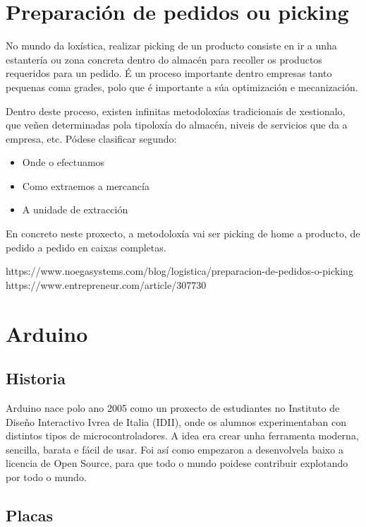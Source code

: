 \documentclass[11pt,twoside]{book}
\begin{document}
\chapter{Preparación de pedidos ou picking}

No mundo da loxística, realizar picking de un producto consiste en ir a unha estantería ou zona concreta dentro do almacén para recoller os productos requeridos para un pedido. É un proceso importante dentro empresas tanto pequenas coma grades, polo que é importante a súa optimización e mecanización.

Dentro deste proceso, existen infinitas metodoloxías tradicionais de xestionalo, que veñen determinadas pola tipoloxía do almacén, niveis de servicios que da a empresa, etc. 
Pódese clasificar segundo:

\begin{itemize}
    \item Onde o efectuamos
    \item Como extraemos a mercancía
    \item A unidade de extracción
\end{itemize}

En concreto neste proxecto, a metodoloxía vai ser picking de home a producto, de pedido a pedido en caixas completas.



https://www.noegasystems.com/blog/logistica/preparacion-de-pedidos-o-picking
https://www.entrepreneur.com/article/307730

\chapter{Arduino}

\section{Historia}

Arduino nace polo ano 2005 como un proxecto de estudiantes no Instituto de Diseño Interactivo Ivrea de Italia (IDII), onde os alumnos experimentaban con distintos tipos de microcontroladores. A idea era crear unha ferramenta moderna, sencilla, barata e fácil de usar. Foi así como empezaron a desenvolvela baixo a licencia de Open Source, para que todo o mundo poidese contribuir explotando por todo o mundo.

\section{Placas}
\end{document}
